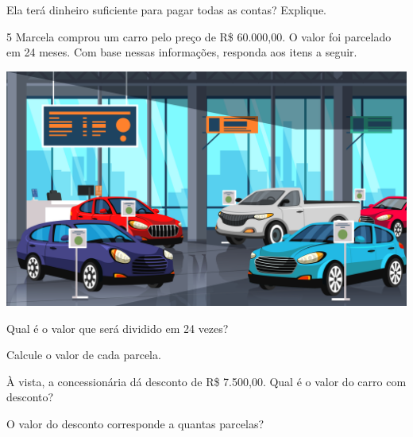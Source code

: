 
Ela terá dinheiro suficiente para pagar todas as contas? Explique.


\num{5} Marcela comprou um carro pelo preço de R\$ 60.000,00.
O valor foi parcelado em 24 meses. Com base nessas informações,
responda aos itens a seguir.

\begin{center}
\includegraphics[width=.7\textwidth]{media/image37b.jpeg}
\end{center}

\begin{escolha}
\item Qual é o valor que será dividido em 24 vezes?\\

\item Calcule o valor de cada parcela.\\

\item À vista, a concessionária dá desconto de R\$ 7.500,00.
  Qual é o valor do carro com desconto? \\

\item O valor do desconto corresponde a quantas parcelas?\\
\end{escolha}

